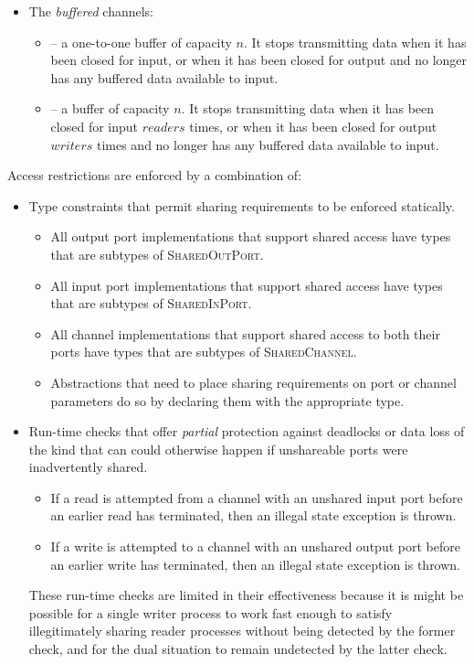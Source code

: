 \documentclass[12pt]{IOS-Book-Article-CPA-2017}
\begin{document}
\begin{itemize}
\item The \textit{buffered} channels:

\begin{itemize}
\item {} -- a one-to-one buffer of capacity
      $n$. It stops transmitting data when it has been closed for input, or
      when it has been closed for output and  no longer has any
      buffered data available to input.
\item {} --  a 
buffer of capacity $n$.  It stops transmitting data when
it has been closed for input $readers$ times, or when it has been closed for 
output $writers$ times and  no longer has any
buffered data available to input.
\end{itemize}
\end{itemize}
\noindent Access restrictions are enforced by a combination of:
\begin{itemize}
\item Type constraints that permit sharing requirements to be enforced statically.
\begin{itemize}
\item All output port implementations that support shared access
      have types that are subtypes of \textsc{SharedOutPort}.

\item All input port implementations that support shared access
      have types that are subtypes of \textsc{SharedInPort}.

\item All channel implementations that support shared access
      to both their ports have types that are 
      subtypes of \textsc{SharedChannel}.

\item Abstractions that need to place sharing requirements on
      port or channel parameters do so by declaring them with the appropriate 
      type.
      
\end{itemize}
\item Run-time checks that offer \textit{partial} protection against
deadlocks or data loss of the kind that can could
otherwise happen if unshareable ports were
inadvertently shared. 
\begin{itemize}
\item If a read is attempted from a channel with an unshared input port 
      before an earlier read has terminated, then an illegal state
      exception is thrown.
\item If a write is attempted to a channel with an unshared output port 
      before an earlier write has terminated, then an illegal state
      exception is thrown.
\end{itemize}
These run-time checks are limited in their effectiveness because it is
might be possible for a single writer process to work fast enough to
satisfy illegitimately sharing reader processes without being
detected by the former check, and for the dual situation
to remain undetected by the latter check.
\end{itemize}
\end{document}

